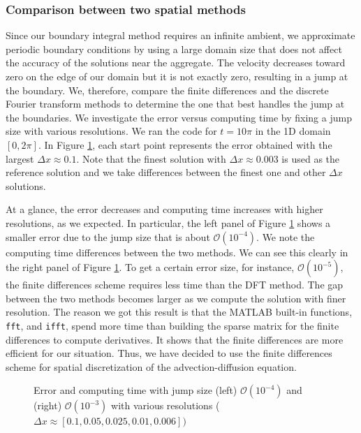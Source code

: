 \subsubsection{Comparison between two spatial methods}
Since our boundary integral method requires an infinite ambient, we approximate periodic boundary conditions by using a large domain size that does not affect the accuracy of the solutions near the aggregate. The velocity decreases toward zero on the edge of our domain
but it is not exactly zero, resulting in a jump at the boundary.
We, therefore, compare the finite differences and the discrete Fourier transform methods to determine the one that best handles the jump at the boundaries. We investigate the error versus computing time by fixing a jump size with various resolutions. We ran the code for $t = 10 \pi$ in the 1D domain $[0, 2\pi].$ In Figure \ref{fig_precision}, each start point represents the error obtained with the largest $\Delta x \approx 0.1$. Note that the finest solution with $\Delta x \approx 0.003$ is used as the reference solution and we take differences between the finest one and other $\Delta x$ solutions.  
\par
At a glance, the error decreases and computing time increases with higher resolutions, as we expected. In particular, the left panel of Figure \ref{fig_precision} shows a smaller error due to the jump size that is about $\mathcal{O}(10^{-4})$.
We note the computing time differences between the two methods. We can see this clearly in the right panel of Figure \ref{fig_precision}. To get a certain error size, for instance, $\mathcal{O}(10^{-5})$, the finite differences scheme requires less time than the DFT method. The gap between the two methods becomes larger as we compute the solution with finer resolution.  
The reason we got this result is that the MATLAB built-in functions, \verb+fft+, and \verb+ifft+, spend more time than building the sparse matrix for the finite differences to compute derivatives. It shows that the finite differences are more efficient for our situation. 
Thus, we have decided to use the finite differences scheme for spatial discretization of the advection-diffusion equation.
\begin{figure}[ht]
	\begin{center}
	\end{center}
	\caption{Error and computing time with jump size (left) $\mathcal{O}(10^{-4})$ and (right) $\mathcal{O}(10^{-3})$ with various resolutions ($\Delta x \approx [0.1, 0.05, 0.025, 0.01, 0.006])$}
	\label{fig_precision}
\end{figure}

